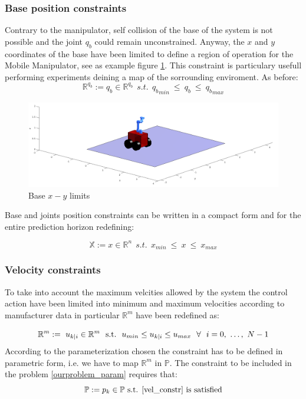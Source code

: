 \subsubsection*{Base position constraints}
	Contrary to the manipulator, self collision of the base of the system is not possible and the joint $q_b$ could remain unconstrained. Anyway, the $x$ and $y$ coordinates of the base have been limited to define a region of operation for the Mobile Manipulator, see as example figure \ref{xy_limits}. This constraint is particulary usefull performing experiments deining a map of the sorrounding enviroment. As before: 
	\begin{equation}
		\mathbb{R}^{q_b}:=q_b \in \mathbb{R}^{q_b}\ \ s.t.\ \  {q_b}_{min}\ \leq\ q_b\ \leq\ {q_b}_{max} 
	\end{equation}

	\begin{figure}[h!]
	\centering
	\includegraphics[scale=0.25]{IMMAGINI/xy_limits.png}
	\caption{Base $x-y$ limits}
	\label{xy_limits}
	\end{figure}

	Base and joints position constraints can be written in a compact form and for the entire prediction horizon redefining: 

	\begin{equation}
	\mathbb{X}:= x \in \mathbb{R}^{n}\ \ s.t.\ \  {x}_{min}\ \leq\ x\ \leq\ {x}_{max}
	\end{equation}

\subsubsection*{Velocity constraints}
	To take into account the maximum velcities allowed by the system the control action have been limited into minimum and maximum velocities according to manufacturer data in particular $\mathbb{R}^m$ have been redefined as:

	\begin{equation*}
	\mathbb{R}^m:=\ {u}_{k|i} \in \mathbb{R}^m\ \ \textnormal{s.t.}\ \ u_{min}\leq{u_{k|i}}\leq u_{max}\ \ \forall\ \  i=0,\ \dots,\ N-1
	\label{vel_constr}
	\end{equation*}
	According to the parameterization chosen the constraint has to be defined in parametric form, i.e. we have to map $\mathbb{R}^m$ in $\mathbb{P}$. The constraint to be included in the problem \ref{ourproblem_param} requires that:
	\begin{equation*}
		\mathbb{P}:=p_k \in \mathbb{P} \textnormal{  s.t. \ref{vel_constr} is satisfied}
	\end{equation*}

